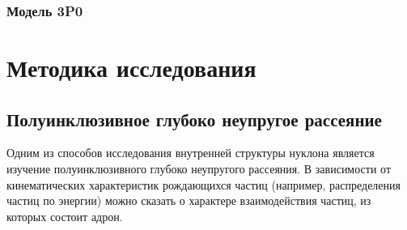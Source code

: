 \documentclass{extreport}
\begin{document}
\subsection{Модель 3P0}
\newpage
\chapter{Методика исследования}
\section{Полуинклюзивное глубоко неупругое рассеяние}
Одним из способов исследования внутренней структуры нуклона является изучение полуинклюзивного глубоко неупругого рассеяния. В зависимости от кинематических характеристик рождающихся частиц (например, распределения частиц по энергии) можно сказать о характере взаимодействия частиц, из которых состоит адрон. 
\end{document}
